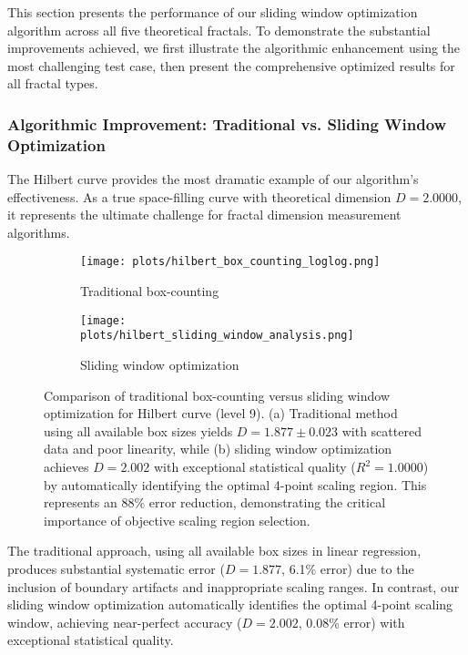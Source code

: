 \documentclass[preprint,12pt]{elsarticle}
\begin{document}
This section presents the performance of our sliding window optimization algorithm across all five theoretical fractals. To demonstrate the substantial improvements achieved, we first illustrate the algorithmic enhancement using the most challenging test case, then present the comprehensive optimized results for all fractal types.

\subsubsection{Algorithmic Improvement: Traditional vs. Sliding Window Optimization}

The Hilbert curve provides the most dramatic example of our algorithm's effectiveness. As a true space-filling curve with theoretical dimension $D = 2.0000$, it represents the ultimate challenge for fractal dimension measurement algorithms.

\begin{figure}[H]
\centering
\begin{subfigure}[b]{0.48\textwidth}
    \centering
    \texttt{[image: plots/hilbert\_box\_counting\_loglog.png]}
    \caption{Traditional box-counting}
    \label{fig:hilbert_base}
\end{subfigure}
\hfill
\begin{subfigure}[b]{0.48\textwidth}
    \centering
    \texttt{[image: plots/hilbert\_sliding\_window\_analysis.png]}
    \caption{Sliding window optimization}
    \label{fig:hilbert_optimized}
\end{subfigure}

\caption{Comparison of traditional box-counting versus sliding window optimization for Hilbert curve (level 9). (a) Traditional method using all available box sizes yields $D = 1.877 \pm 0.023$ with scattered data and poor linearity, while (b) sliding window optimization achieves $D = 2.002$ with exceptional statistical quality ($R^2 = 1.0000$) by automatically identifying the optimal 4-point scaling region. This represents an 88\% error reduction, demonstrating the critical importance of objective scaling region selection.}
\label{fig:hilbert_comparison}
\end{figure}

The traditional approach, using all available box sizes in linear regression, produces substantial systematic error ($D = 1.877$, 6.1\% error) due to the inclusion of boundary artifacts and inappropriate scaling ranges. In contrast, our sliding window optimization automatically identifies the optimal 4-point scaling window, achieving near-perfect accuracy ($D = 2.002$, 0.08\% error) with exceptional statistical quality.
\end{document}
